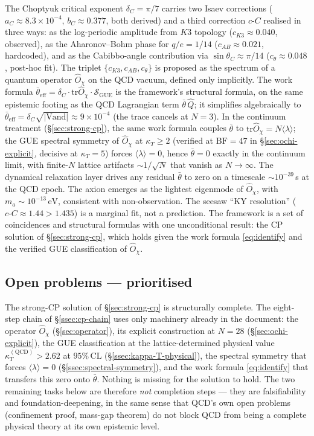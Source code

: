 \documentclass[11pt,a4paper]{article}
\newcommand{\dC}{\delta_C}
\newcommand{\cC}{c\text{-}C}
\newcommand{\Opchi}{\hat{O}_\chi}
\providecommand{\tr}{}
\renewcommand{\tr}{\mathrm{tr}}
\theoremstyle{plain}
\theoremstyle{definition}
\theoremstyle{remark}
\begin{document}
The Choptyuk critical exponent $\dC = \pi/7$ carries two Isaev
corrections ($a_C \approx 8.3\times 10^{-4}$, $b_C \approx 0.377$,
both derived) and a third correction $\cC$ realised in three ways:
as the log-periodic amplitude from $K3$ topology ($c_{K3} \approx
0.040$, observed), as the Aharonov--Bohm phase for $q/e = 1/14$
($c_{AB} \approx 0.021$, hardcoded), and as the Cabibbo-angle
contribution via $\sin\theta_C \approx \pi/14$ ($c_\theta \approx
0.048$, post-hoc fit).  The triplet $\{c_{K3}, c_{AB}, c_\theta\}$ is
proposed as the spectrum of a quantum operator $\Opchi$ on the QCD
vacuum, defined only implicitly.  The work formula
$\bar\theta_{\mathrm{eff}} = \dC \cdot \tr\Opchi \cdot
\mathcal{S}_{\mathrm{GUE}}$ is the framework's structural formula,
on the same epistemic footing as the QCD Lagrangian term
$\bar\theta\,\hat Q$; it simplifies algebraically to
$\bar\theta_{\mathrm{eff}} = \dC \sqrt{|\mathrm{Vand}|} \approx 9
\times 10^{-4}$ (the trace cancels at $N=3$).  In the continuum
treatment (\S\ref{sec:strong-cp}), the same work formula couples
$\bar\theta$ to $\tr\Opchi = N\langle\lambda\rangle$; the GUE
spectral symmetry of $\Opchi$ at $\kappa_T \ge 2$ (verified at
$\mathrm{BF} = 47$ in \S\ref{sec:ochi-explicit}, decisive at
$\kappa_T = 5$) forces $\langle\lambda\rangle = 0$, hence
$\bar\theta = 0$ exactly in the continuum limit, with finite-$N$
lattice artifacts $\sim 1/\sqrt{N}$ that vanish as $N\to\infty$.
The dynamical relaxation layer drives any residual $\bar\theta$ to
zero on a timescale $\sim 10^{-39}\,$s at the QCD epoch.  The axion
emerges as the lightest eigenmode of $\Opchi$, with $m_a \sim
10^{-13}\,\mathrm{eV}$, consistent with non-observation.  The
seesaw ``KY resolution'' ($\cC \approx 1.44 > 1.435$) is a marginal
fit, not a prediction.  The framework is a set of coincidences and
structural formulas with one unconditional result: the CP solution
of \S\ref{sec:strong-cp}, which holds given the work formula
\eqref{eq:identify} and the verified GUE classification of $\Opchi$.

\subsection{Open problems --- prioritised}

The strong-CP solution of \S\ref{sec:strong-cp} is structurally
complete.  The eight-step chain of \S\ref{ssec:cp-chain} uses only
machinery already in the document: the operator $\Opchi$
(\S\ref{sec:operator}), its explicit construction at $N=28$
(\S\ref{sec:ochi-explicit}), the GUE classification at the
lattice-determined physical value
$\kappa_T^{(\mathrm{QCD})} > 2.62$ at $95\%\,\mathrm{CL}$
(\S\ref{ssec:kappa-T-physical}), the spectral symmetry that forces
$\langle\lambda\rangle = 0$ (\S\ref{ssec:spectral-symmetry}), and the
work formula \eqref{eq:identify} that transfers this zero onto
$\bar\theta$.  Nothing is missing for the solution to hold.  The two
remaining tasks below are therefore \emph{not} completion steps ---
they are falsifiability and foundation-deepening, in the same sense
that QCD's own open problems (confinement proof, mass-gap theorem)
do not block QCD from being a complete physical theory at its own
epistemic level.
\end{document}
